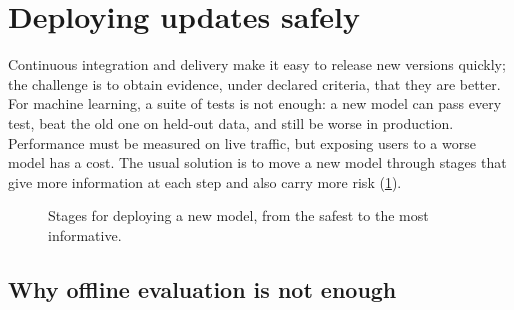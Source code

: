 \section{Deploying updates safely}\label{sec:safedeploy}

Continuous integration and delivery make it easy to release new versions quickly; the challenge is to obtain
evidence, under declared criteria, that they are better. For machine learning, a suite of tests is not enough: a new model can pass every test, beat the
old one on held-out data, and still be worse in production. Performance must be measured on live traffic, but exposing
users to a worse model has a cost. The usual solution is to move a new model through stages that give more information at each step and also carry more risk (\cref{fig:rollout}).

\begin{figure}[htbp]
\centering
{}
\caption{Stages for deploying a new model, from the safest to the most informative.}
\label{fig:rollout}
\end{figure}

\subsection{Why offline evaluation is not enough}

